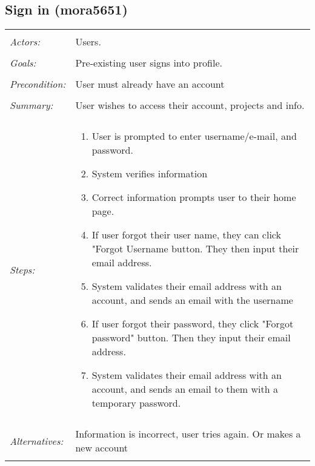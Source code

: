 \documentclass[11pt]{report}
\begin{document}
\subsection{Sign in (mora5651)}
\begin{tabular}{ p{2cm} p{12cm} }
 \hline
 \\
 \textit{Actors:} & Users. \\ 
 \\
 \textit{Goals:} & Pre-existing user signs into profile. \\
 \\
\textit{Precondition:} & User must already have an account \\
\\
\textit{Summary:} & User wishes to access their account, projects and info. \\
\\
 \textit{Steps:} & \begin{enumerate}
  \item User is prompted to enter username/e-mail, and password. 
  \item System verifies information
  \item Correct information prompts user to their home page. 
  \item If user forgot their user name, they can click "Forgot Username button. They then input their email address.
  \item System validates their email address with an account, and sends an email with the username  
  \item If user forgot their password, they click "Forgot password" button. Then they input their email address.
  \item System validates their email address with an account, and sends an email to them with a temporary password.
 \end{enumerate} \\
 \\
 \textit{Alternatives:} & Information is incorrect, user tries again. Or makes a new account \\
 \\
\hline
\end{tabular}
\end{document}
